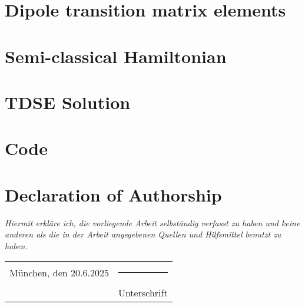 \documentclass[12pt, twoside]{report}
\begin{document}
\chapter{Dipole transition matrix elements}

\cleardoublepage


\chapter{Semi-classical Hamiltonian}

\cleardoublepage


\chapter{TDSE Solution}

\cleardoublepage


\chapter{Code}

\cleardoublepage




\cleardoublepage


\chapter*{Declaration of Authorship}
\emph{Hiermit erkläre ich, die vorliegende Arbeit selbständig verfasst zu haben und keine anderen als die in der Arbeit angegebenen Quellen und Hilfsmittel benutzt zu haben.}

\vspace{2cm}  
\noindent
\begin{tabular}{p{7cm} p{7cm}}
    München, den 20.6.2025 & \rule{6cm}{0.4pt} \\  
    & Unterschrift
\end{tabular}
\end{document}
